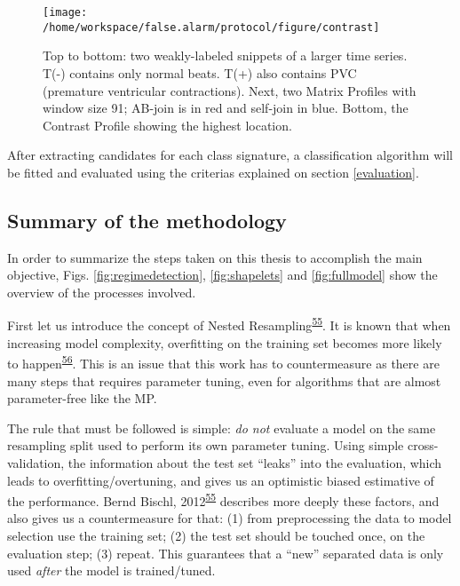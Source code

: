 \documentclass[12pt,twoside]{fmupthesis}
\begin{document}
\hfill\break
\begin{figure}

{\centering \texttt{[image: /home/workspace/false.alarm/protocol/figure/contrast]} 

}

\caption{Top to bottom: two weakly-labeled snippets of a larger time series. T(-) contains only normal beats. T(+) also contains PVC (premature ventricular contractions). Next, two Matrix Profiles with window size 91; AB-join is in red and self-join in blue. Bottom, the Contrast Profile showing the highest location.}\label{fig:contrast}
\end{figure}
After extracting candidates for each class signature, a classification algorithm will be fitted and
evaluated using the criterias explained on section \ref{evaluation}.

\hypertarget{summary-of-the-methodology}{%
\subsection{Summary of the methodology}\label{summary-of-the-methodology}}

In order to summarize the steps taken on this thesis to accomplish the main objective, Figs.
\ref{fig:regimedetection}, \ref{fig:shapelets} and \ref{fig:fullmodel} show the overview of the
processes involved.

First let us introduce the concept of Nested Resampling\textsuperscript{\protect\hyperlink{ref-Bischl2012}{55}}. It is known that when
increasing model complexity, overfitting on the training set becomes more likely to happen\textsuperscript{\protect\hyperlink{ref-Hastie2009}{56}}. This is an issue that this work has to countermeasure as there are many steps that
requires parameter tuning, even for algorithms that are almost parameter-free like the MP.

The rule that must be followed is simple: \emph{do not} evaluate a model on the same resampling split used
to perform its own parameter tuning. Using simple cross-validation, the information about the test
set ``leaks'' into the evaluation, which leads to overfitting/overtuning, and gives us an optimistic
biased estimative of the performance. Bernd Bischl, 2012\textsuperscript{\protect\hyperlink{ref-Bischl2012}{55}} describes more deeply these
factors, and also gives us a countermeasure for that: (1) from preprocessing the data to model
selection use the training set; (2) the test set should be touched once, on the evaluation step; (3)
repeat. This guarantees that a ``new'' separated data is only used \emph{after} the model is trained/tuned.
\end{document}
